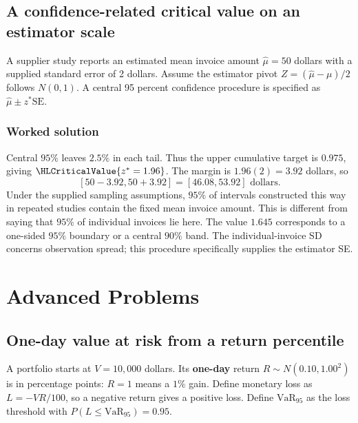 \subsection{A confidence-related critical value on an estimator scale}\label{prob:sec:general-worked2}
A supplier study reports an estimated mean invoice amount $\widehat\mu=50$ dollars with a supplied standard error of 2 dollars. Assume the estimator pivot $Z=(\widehat\mu-\mu)/2$ follows $N(0,1)$. A central 95 percent confidence procedure is specified as $\widehat\mu\pm z^*\mathrm{SE}$.
\subsubsection*{Worked solution}\label{sol:sec:general-worked2}
Central $95\%$ leaves $2.5\%$ in each tail. Thus the upper cumulative target is $0.975$, giving $\HLCriticalValue{z^*=1.96}$. The margin is $1.96(2)=3.92$ dollars, so
\[
[50-3.92,50+3.92]=[46.08,53.92]\text{ dollars}.
\]
Under the supplied sampling assumptions, $95\%$ of intervals constructed this way in repeated studies contain the fixed mean invoice amount. This is different from saying that $95\%$ of individual invoices lie here. The value $1.645$ corresponds to a one-sided $95\%$ boundary or a central $90\%$ band. The individual-invoice SD concerns observation spread; this procedure specifically supplies the estimator SE.
\section{Advanced Problems}\label{sec:advanced}

\subsection{One-day value at risk from a return percentile}\label{prob:sec:advanced0}
A portfolio starts at $V=10{,}000$ dollars. Its \textbf{one-day} return $R\sim N(0.10,1.00^2)$ is in percentage points: $R=1$ means a $1\%$ gain. Define monetary loss as $L=-VR/100$, so a negative return gives a positive loss. Define $\mathrm{VaR}_{95}$ as the loss threshold with $P(L\le\mathrm{VaR}_{95})=0.95$.
